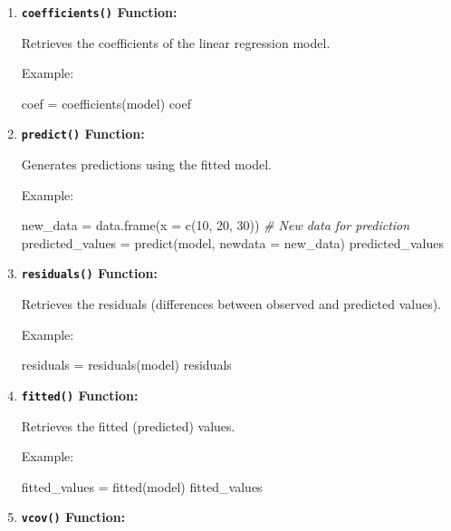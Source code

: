 \documentclass[
]{article}
\newenvironment{Shaded}{}{}
\newcommand{\AttributeTok}[1]{\textcolor[rgb]{0.49,0.56,0.16}{#1}}
\newcommand{\CommentTok}[1]{\textcolor[rgb]{0.38,0.63,0.69}{\textit{#1}}}
\newcommand{\DecValTok}[1]{\textcolor[rgb]{0.25,0.63,0.44}{#1}}
\newcommand{\FunctionTok}[1]{\textcolor[rgb]{0.02,0.16,0.49}{#1}}
\newcommand{\NormalTok}[1]{#1}
\newcommand{\OtherTok}[1]{\textcolor[rgb]{0.00,0.44,0.13}{#1}}
\begin{document}
\begin{enumerate}
\def\labelenumi{\arabic{enumi}.}
\item
  \textbf{\texttt{coefficients()} Function:}

  Retrieves the coefficients of the linear regression model.

  Example:

\begin{Shaded}
\begin{Highlighting}[]
\NormalTok{coef }\OtherTok{=} \FunctionTok{coefficients}\NormalTok{(model)}
\NormalTok{coef}
\end{Highlighting}
\end{Shaded}
\item
  \textbf{\texttt{predict()} Function:}

  Generates predictions using the fitted model.

  Example:

\begin{Shaded}
\begin{Highlighting}[]
\NormalTok{new\_data }\OtherTok{=} \FunctionTok{data.frame}\NormalTok{(}\AttributeTok{x =} \FunctionTok{c}\NormalTok{(}\DecValTok{10}\NormalTok{, }\DecValTok{20}\NormalTok{, }\DecValTok{30}\NormalTok{))  }\CommentTok{\# New data for prediction}
\NormalTok{predicted\_values }\OtherTok{=} \FunctionTok{predict}\NormalTok{(model, }\AttributeTok{newdata =}\NormalTok{ new\_data)}
\NormalTok{predicted\_values}
\end{Highlighting}
\end{Shaded}
\item
  \textbf{\texttt{residuals()} Function:}

  Retrieves the residuals (differences between observed and predicted
  values).

  Example:

\begin{Shaded}
\begin{Highlighting}[]
\NormalTok{residuals }\OtherTok{=} \FunctionTok{residuals}\NormalTok{(model)}
\NormalTok{residuals}
\end{Highlighting}
\end{Shaded}
\item
  \textbf{\texttt{fitted()} Function:}

  Retrieves the fitted (predicted) values.

  Example:

\begin{Shaded}
\begin{Highlighting}[]
\NormalTok{fitted\_values }\OtherTok{=} \FunctionTok{fitted}\NormalTok{(model)}
\NormalTok{fitted\_values}
\end{Highlighting}
\end{Shaded}
\item
  \textbf{\texttt{vcov()} Function:}


\end{enumerate}
\end{document}
